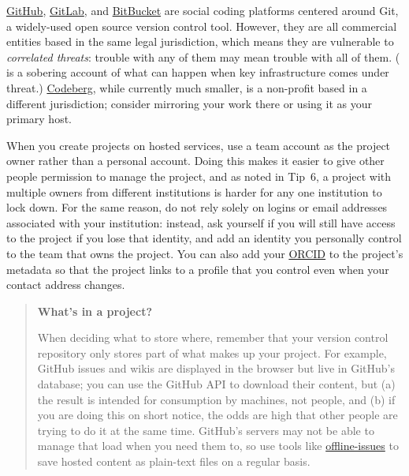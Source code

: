 \documentclass[10pt,letterpaper]{article}
\begin{document}
\href{https://github.com/}{GitHub},
\href{https://gitlab.com}{GitLab},
and \href{https://bitbucket.org/}{BitBucket}
are social coding platforms centered around Git,
a widely-used open source version control tool.
However,
they are all commercial entities based in the same legal jurisdiction,
which means they are vulnerable to \emph{correlated threats}:
trouble with any of them may mean trouble with all of them.
(\cite{Tamburri2020} is a sobering account of what can happen when key infrastructure comes under threat.)
\href{https://codeberg.org/}{Codeberg},
while currently much smaller,
is a non-profit based in a different jurisdiction;
consider mirroring your work there or using it as your primary host.

When you create projects on hosted services,
use a team account as the project owner rather than a personal account.
Doing this makes it easier to give other people permission to manage the project,
and as noted in Tip~6,
a project with multiple owners from different institutions
is harder for any one institution to lock down.
For the same reason,
do not rely solely on logins or email addresses associated with your institution:
instead,
ask yourself if you will still have access to the project if you lose that identity,
and add an identity you personally control to the team that owns the project.
You can also add your \href{https://orcid.org/}{ORCID} to the project's metadata
so that the project links to a profile that you control
even when your contact address changes.

\begin{quote}
  \noindent
  \textbf{What's in a project?}

  When deciding what to store where,
  remember that your version control repository only stores part of what makes up your project.
  For example,
  GitHub issues and wikis are displayed in the browser but live in GitHub's database;
  you can use the GitHub API to download their content,
  but (a) the result is intended for consumption by machines, not people,
  and (b) if you are doing this on short notice,
  the odds are high that other people are trying to do it at the same time.
  GitHub's servers may not be able to manage that load when you need them to,
  so use tools like \href{https://github.com/jlord/offline-issues}{offline-issues}
  to save hosted content as plain-text files on a regular basis.
\end{quote}
\end{document}

